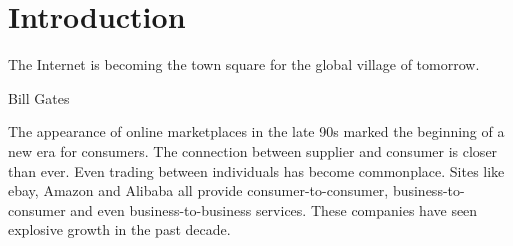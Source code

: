 \section{Introduction}
\epigraph{The Internet is becoming the town square for the global village of tomorrow.}{Bill Gates}

The appearance of online marketplaces in the late 90s marked the beginning of a new era for consumers.
The connection between supplier and consumer is closer than ever.
Even trading between individuals has become commonplace.
Sites like ebay, Amazon and Alibaba all provide consumer-to-consumer, business-to-consumer and even business-to-business services.
These companies have seen explosive growth in the past decade.